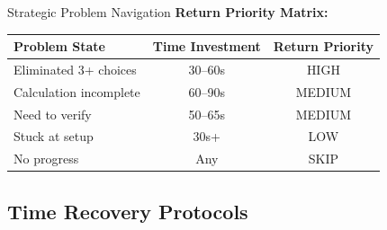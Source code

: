 \documentclass{article}
\begin{document}
\begin{timebox}{Strategic Problem Navigation}
\textbf{Return Priority Matrix:}
\begin{center}
\begin{tabular}{|l|c|c|}
\hline
\textbf{Problem State} & \textbf{Time Investment} & \textbf{Return Priority} \\
\hline
Eliminated 3+ choices & 30--60s & HIGH \\
Calculation incomplete & 60--90s & MEDIUM \\
Need to verify & 50--65s & MEDIUM \\
Stuck at setup & 30s+ & LOW \\
No progress & Any & SKIP \\
\hline
\end{tabular}
\end{center}
\end{timebox}

\subsection{Time Recovery Protocols}
\end{document}
